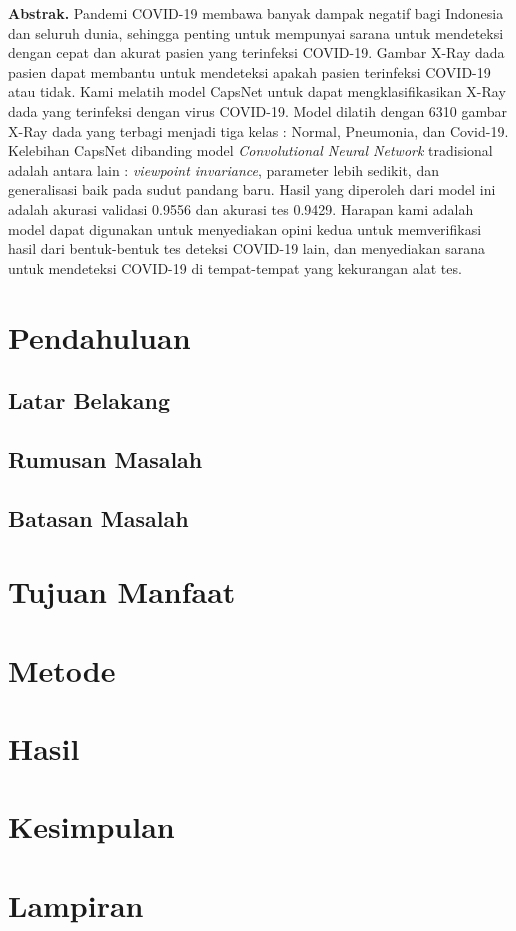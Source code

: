 \documentclass{article}
\begin{document}
  \newpage
  \textbf{Abstrak.} Pandemi COVID-19 membawa banyak dampak negatif bagi Indonesia dan seluruh dunia, sehingga penting untuk mempunyai sarana untuk mendeteksi dengan cepat dan akurat pasien yang terinfeksi COVID-19. Gambar X-Ray dada pasien dapat membantu untuk mendeteksi apakah pasien terinfeksi COVID-19 atau tidak. Kami melatih model CapsNet untuk dapat mengklasifikasikan X-Ray dada yang terinfeksi dengan virus COVID-19. Model dilatih dengan 6310 gambar X-Ray dada yang terbagi menjadi tiga kelas : Normal, Pneumonia, dan Covid-19. Kelebihan CapsNet dibanding model \textit{Convolutional Neural Network} tradisional adalah antara lain : \textit{viewpoint invariance}, parameter lebih sedikit, dan generalisasi baik pada sudut pandang baru. Hasil yang diperoleh dari model ini adalah akurasi validasi 0.9556 dan akurasi tes 0.9429. Harapan kami adalah model dapat digunakan untuk menyediakan opini kedua untuk memverifikasi hasil dari bentuk-bentuk tes deteksi COVID-19 lain, dan menyediakan sarana untuk mendeteksi COVID-19 di tempat-tempat yang kekurangan alat tes.
  \newpage
  \tableofcontents
  \newpage
  \section{Pendahuluan}
  	\subsection{Latar Belakang}
  	\subsection{Rumusan Masalah}
  	\subsection{Batasan Masalah}
  \section{Tujuan Manfaat}
  \section{Metode}
  \section{Hasil}
  \section{Kesimpulan}
  \section{Lampiran}
\end{document}
